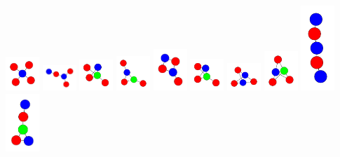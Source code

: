 \documentclass[openany]{tufte-book} %
\theoremstyle{plain}
\begin{document}
\begin{marginfigure}
		\includegraphics[width=0.5in]{graphs/all/0001001011.pdf}
		\includegraphics[width=0.5in]{graphs/all/0011001010.pdf}
		\includegraphics[width=0.5in]{graphs/all/0011001011.pdf}
		\includegraphics[width=0.5in]{graphs/all/0011010011.pdf}
		\includegraphics[width=0.5in]{graphs/all/0011011010.pdf}
		\includegraphics[width=0.5in]{graphs/all/0011011011.pdf}
		\includegraphics[width=0.5in]{graphs/all/0011011110.pdf}
		\includegraphics[width=0.5in]{graphs/all/0011011111.pdf}
		\includegraphics[width=0.5in]{graphs/all/0101011000.pdf}
		\includegraphics[width=0.5in]{graphs/all/0101011010.pdf}

\end{marginfigure}
\end{document}
